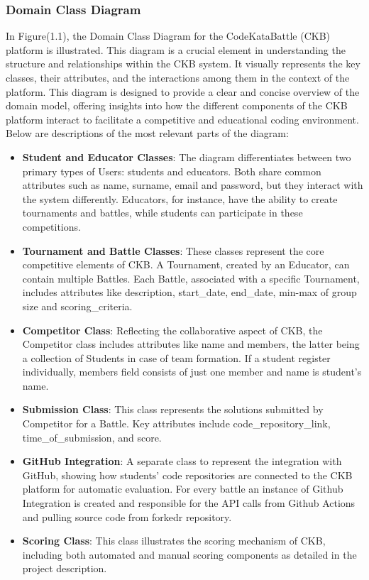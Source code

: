 \subsubsection{Domain Class Diagram}
In Figure(1.1), the Domain Class Diagram for the CodeKataBattle (CKB) platform is illustrated. This diagram is a crucial element in understanding the structure and relationships within the CKB system. It visually represents the key classes, their attributes, and the interactions among them in the context of the platform. This diagram is designed to provide a clear and concise overview of the domain model, offering insights into how the different components of the CKB platform interact to facilitate a competitive and educational coding environment. Below are descriptions of the most relevant parts of the diagram:
\begin{itemize}
    \item \textbf{Student and Educator Classes}: The diagram differentiates between two primary types of Users: students and educators. Both share common attributes such as name, surname, email and password, but they interact with the system differently. Educators, for instance, have the ability to create tournaments and battles, while students can participate in these competitions.
    \item \textbf{Tournament and Battle Classes}: These classes represent the core competitive elements of CKB. A Tournament, created by an Educator, can contain multiple Battles. Each Battle, associated with a specific Tournament, includes attributes like description, start\_date, end\_date, min-max of group size and scoring\_criteria.
    \item \textbf{Competitor Class}: Reflecting the collaborative aspect of CKB, the Competitor class includes attributes like name and members, the latter being a collection of Students in case of team formation. If a student register individually, members field consists of just one member and name is student's name.
    \item \textbf{Submission Class}: This class represents the solutions submitted by Competitor for a Battle. Key attributes include code\_repository\_link, time\_of\_submission, and score.
    \item \textbf{GitHub Integration}: A separate class to represent the integration with GitHub, showing how students' code repositories are connected to the CKB platform for automatic evaluation. For every battle an instance of Github Integration is created and responsible for the API calls from Github Actions and pulling source code from forkedr repository.
    \item \textbf{Scoring Class}: This class illustrates the scoring mechanism of CKB, including both automated and manual scoring components as detailed in the project description.
\end{itemize}
